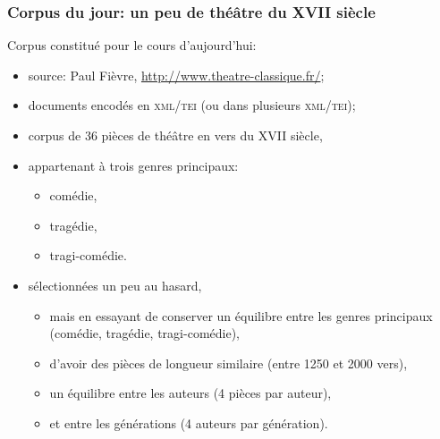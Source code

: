 \documentclass{beamer}
\begin{document}
\begin{frame}[fragile]
\frametitle{Corpus du jour: un peu de théâtre du XVII\ieme{} siècle}

Corpus constitué pour le cours d'aujourd'hui:

\begin{itemize}
	\item source: Paul Fièvre,  \url{http://www.theatre-classique.fr/};
	\item documents encodés en \textsc{xml}/\textsc{tei} (ou dans plusieurs \textsc{xml/tei});
	\item corpus de \alert{36} pièces de théâtre en vers du XVII\ieme{} siècle,
	\item appartenant à trois genres principaux:
		\begin{itemize}
			\item comédie,
			\item tragédie,
			\item tragi-comédie.
		\end{itemize}
	\item sélectionnées un peu au hasard,
	\begin{itemize}
		\item mais en essayant de conserver un équilibre entre les genres principaux (comédie, tragédie, tragi-comédie),
		\item d'avoir des pièces de longueur similaire (entre 1250 et 2000 vers),
		\item un équilibre entre les auteurs (4 pièces par auteur),
		\item et entre les générations (4 auteurs par génération).
	\end{itemize}
\end{itemize}

\end{frame}
\end{document}
